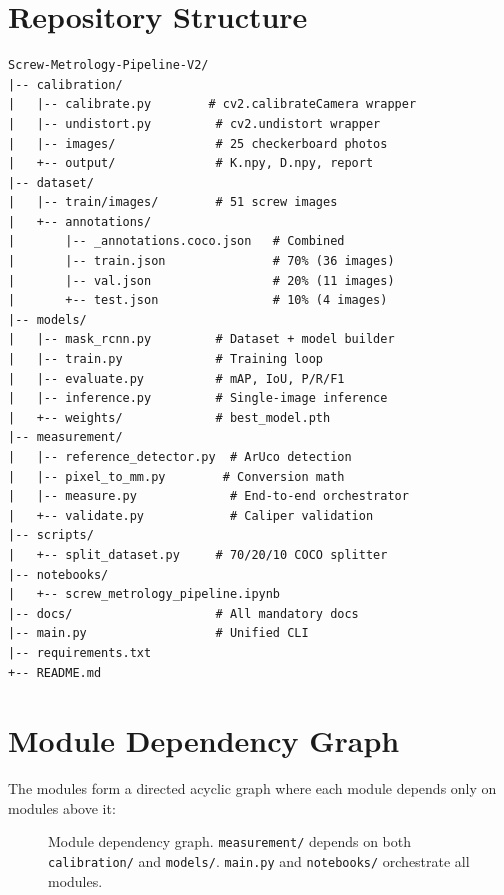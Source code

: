 \documentclass[12pt, a4paper, twoside]{report}
\begin{document}
\section{Repository Structure}
\begin{lstlisting}[style=bashstyle, basicstyle=\ttfamily\footnotesize\color{white}]
Screw-Metrology-Pipeline-V2/
|-- calibration/
|   |-- calibrate.py        # cv2.calibrateCamera wrapper
|   |-- undistort.py         # cv2.undistort wrapper
|   |-- images/              # 25 checkerboard photos
|   +-- output/              # K.npy, D.npy, report
|-- dataset/
|   |-- train/images/        # 51 screw images
|   +-- annotations/
|       |-- _annotations.coco.json   # Combined
|       |-- train.json               # 70% (36 images)
|       |-- val.json                 # 20% (11 images)
|       +-- test.json                # 10% (4 images)
|-- models/
|   |-- mask_rcnn.py         # Dataset + model builder
|   |-- train.py             # Training loop
|   |-- evaluate.py          # mAP, IoU, P/R/F1
|   |-- inference.py         # Single-image inference
|   +-- weights/             # best_model.pth
|-- measurement/
|   |-- reference_detector.py  # ArUco detection
|   |-- pixel_to_mm.py        # Conversion math
|   |-- measure.py             # End-to-end orchestrator
|   +-- validate.py            # Caliper validation
|-- scripts/
|   +-- split_dataset.py     # 70/20/10 COCO splitter
|-- notebooks/
|   +-- screw_metrology_pipeline.ipynb
|-- docs/                    # All mandatory docs
|-- main.py                  # Unified CLI
|-- requirements.txt
+-- README.md
\end{lstlisting}

\section{Module Dependency Graph}
The modules form a directed acyclic graph where each module depends only on modules above it:

\begin{figure}[H]
\centering
{}
\caption{Module dependency graph. \texttt{measurement/} depends on both \texttt{calibration/} and \texttt{models/}. \texttt{main.py} and \texttt{notebooks/} orchestrate all modules.}
\label{fig:module-dep}
\end{figure}
\end{document}
